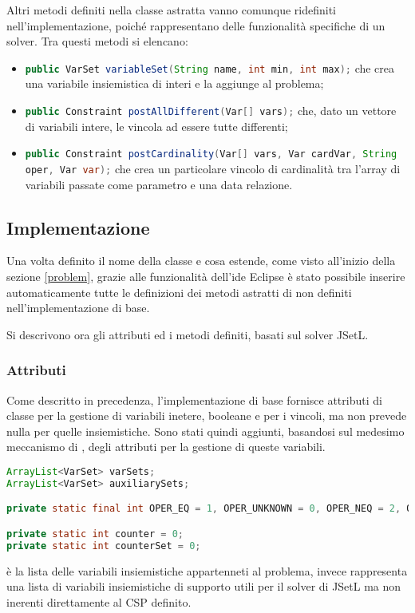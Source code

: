 Altri metodi definiti nella classe astratta vanno comunque ridefiniti
nell'implementazione, poiché rappresentano delle funzionalità specifiche
di un solver. Tra questi metodi si elencano:
\begin{itemize}
\item[-]\lstinline[language = Java]$public VarSet variableSet(String name, int min, int max);$ che crea una variabile insiemistica di interi e la aggiunge al 
problema;
\item[-]\lstinline[language = Java]$public Constraint postAllDifferent(Var[] vars);$ che, dato un vettore di variabili intere, le vincola ad essere tutte
differenti;
\item[-]\lstinline[language = Java]$public Constraint postCardinality(Var[] vars, Var cardVar, String oper, Var var);$ che crea un particolare vincolo di 
cardinalità tra l'array di variabili passate come parametro e una data 
relazione.
\end{itemize}

\subsection{Implementazione}
Una volta definito il nome della classe e cosa estende, come visto all'inizio 
della sezione \ref{problem}, grazie alle funzionalità dell'ide Eclipse è stato
possibile inserire automaticamente tutte le definizioni dei metodi astratti
di  non definiti nell'implementazione di base. 

Si descrivono ora gli attributi ed i metodi definiti, basati sul solver JSetL.

\subsubsection{Attributi}
Come descritto in precedenza, l'implementazione di base fornisce attributi
di classe per la gestione di variabili inetere, booleane e per i vincoli, ma
non prevede nulla per quelle insiemistiche. Sono stati quindi aggiunti,
basandosi sul medesimo meccanismo di , degli attributi
per la gestione di queste variabili.
\begin{lstlisting}[language = Java,
                   caption = {Attributi di JSetLProblem.}]
ArrayList<VarSet> varSets;
ArrayList<VarSet> auxiliarySets;

private static final int OPER_EQ = 1, OPER_UNKNOWN = 0, OPER_NEQ = 2, OPER_LT = 3, OPER_LEQ = 4, OPER_GT = 5, OPER_GEQ = 6;

private static int counter = 0;
private static int counterSet = 0;
\end{lstlisting}
 è la lista delle variabili insiemistiche appartenneti al
problema,  invece rappresenta una lista di variabili
insiemistiche di supporto utili per il solver di JSetL ma non inerenti
direttamente al CSP definito. 

